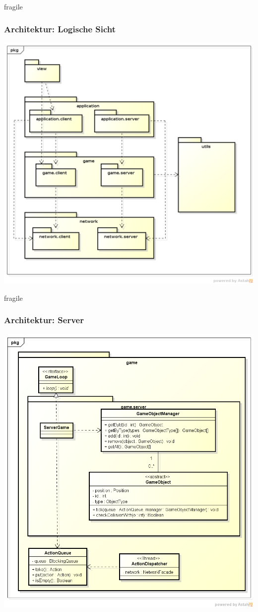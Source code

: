 \documentclass[10pt, compress]{beamer}
\begin{document}
\begin{frame}{fragile}
  \frametitle{Architektur: Logische Sicht}
	\begin{center}
	\includegraphics[scale=0.3]{LogischeSicht}
	\end{center}
\end{frame}

\begin{frame}{fragile}
	\frametitle{Architektur: Server}
	\begin{center}
	\includegraphics[scale=0.3]{ClassDiagramGameServer}
	\end{center}
\end{frame}
\end{document}
